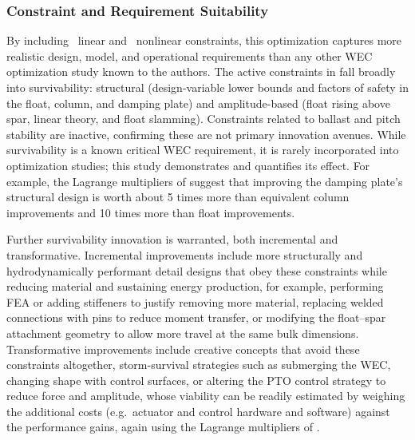\subsubsection{Constraint and Requirement Suitability}
\ifdefined\DISSERTATION
    By including \resultsRE[numLinConstraints]~linear and \resultsRE[numNonlinConstraints]~nonlinear constraints, this optimization captures more realistic design, model, and operational requirements than any other WEC optimization study known to the authors.
    The active constraints in  fall broadly into survivability: structural (design-variable lower bounds and factors of safety in the float, column, and damping plate) and amplitude-based (float rising above spar, linear theory, and float slamming).
    Constraints related to ballast and pitch stability are inactive, confirming these are not primary innovation avenues.
    While survivability is a known critical WEC requirement, it is rarely incorporated into optimization studies; this study demonstrates and quantifies its effect.
    For example, the Lagrange multipliers of  suggest that improving the damping plate's structural design is worth about 5 times more than equivalent column improvements and 10 times more than float improvements.
    
    Further survivability innovation is warranted, both incremental and transformative.
    Incremental improvements include more structurally and hydrodynamically performant detail designs that obey these constraints while reducing material and sustaining energy production, for example, performing FEA or adding stiffeners to justify removing more material, replacing welded connections with pins to reduce moment transfer, or modifying the float--spar attachment geometry to allow more travel at the same bulk dimensions.
    Transformative improvements include creative concepts that avoid these constraints altogether, storm-survival strategies such as submerging the WEC, changing shape with control surfaces, or altering the PTO control strategy to reduce force and amplitude, whose viability can be readily estimated by weighing the additional costs (e.g.\ actuator and control hardware and software) against the performance gains, again using the Lagrange multipliers of .
    
